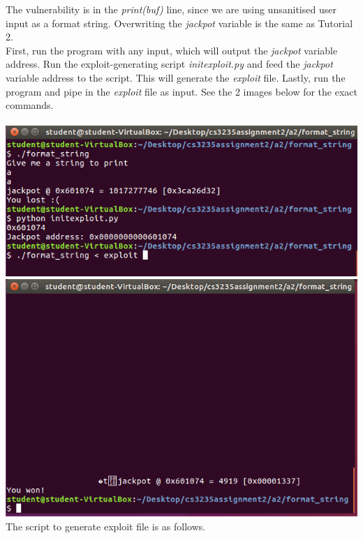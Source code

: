 \documentclass[12pt]{article}
\begin{document}
The vulnerability is in the \emph{print(buf)} line, since we are using unsanitised user input as a format string. Overwriting the \emph{jackpot} variable is the same as Tutorial 2.\\

First, run the program with any input, which will output the \emph{jackpot} variable address.
Run the exploit-generating script \emph{initexploit.py} and feed the \emph{jackpot} variable address to the script.
This will generate the \emph{exploit} file.
Lastly, run the program and pipe in the \emph{exploit} file as input. See the 2 images below for the exact commands.\\\\

\includegraphics[scale=0.7]{./a2/format_string/result1.PNG}\\
\includegraphics[scale=0.7]{./a2/format_string/result2.PNG}\\

The script to generate exploit file is as follows.\\\\
\end{document}
